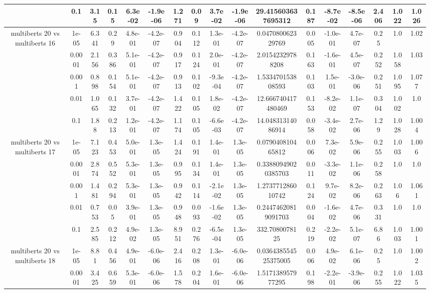\begin{tabular}{|c|c|c|c|c|c|c|c|c|c|c|c|c|c|c|c|c|}
 & 0.1 & 3.15 & 0.15 & 6.3e-02 & -1.9e-06 & 1.271 & 0.09 & 3.7e-02 & -1.9e-06 & 29.415603637695312 & 0.187 & -8.7e-02 & -8.5e-06 & 2.406 & 1.022 & 1.026 \\
\hline
\multirow{5}{*}{multiberts 20 vs multiberts 16} & 1e-05 & 6.341 & 0.29 & 4.8e-01 & -4.2e-07 & 0.904 & 0.112 & 1.3e-01 & -4.2e-07 & 0.047080062329769 & 0.005 & -1.0e-01 & 4.7e-07 & 0.25 & 1.0 & 1.02 \\
 & 0.0001 & 2.156 & 0.386 & 5.1e-01 & -4.2e-07 & 0.917 & 0.124 & 2.0e-01 & -4.2e-07 & 2.01542329788208 & 0.163 & -1.6e-01 & 4.5e-07 & 0.252 & 1.058 & 1.03 \\
 & 0.001 & 0.898 & 0.154 & 5.1e-01 & -4.2e-07 & 0.913 & 0.102 & -9.3e-04 & -4.2e-07 & 1.533470153808593 & 0.103 & 1.5e-01 & -3.0e-06 & 0.251 & 1.095 & 1.077 \\
 & 0.01 & 1.065 & 0.132 & 3.7e-01 & -4.2e-07 & 1.422 & 0.105 & 1.8e-02 & -4.2e-07 & 12.666740417480469 & 0.153 & -8.2e-02 & 1.1e-07 & 0.304 & 1.002 & 1.0 \\
 & 0.1 & 1.88 & 0.213 & 1.2e-01 & -4.2e-07 & 1.174 & 0.105 & -6.6e-03 & -4.2e-07 & 14.04831314086914 & 0.058 & -3.4e-02 & 2.7e-06 & 1.29 & 1.028 & 1.004 \\
\hline
\multirow{5}{*}{multiberts 20 vs multiberts 17} & 1e-05 & 7.123 & 0.453 & 5.0e-01 & 1.3e-05 & 1.424 & 0.191 & 1.4e-01 & 1.3e-05 & 0.079040810465812 & 0.006 & 7.3e-02 & 5.9e-06 & 0.255 & 1.003 & 1.006 \\
 & 0.0001 & 2.874 & 0.552 & 5.3e-01 & 1.3e-05 & 0.995 & 0.134 & 1.4e-01 & 1.3e-05 & 0.33880949020385703 & 0.011 & -3.3e-02 & 1.1e-06 & 0.258 & 1.0 & 1.0 \\
 & 0.001 & 1.481 & 0.294 & 5.3e-01 & 1.3e-05 & 0.942 & 0.114 & -2.1e-02 & 1.3e-05 & 1.273771286010742 & 0.124 & 9.7e-02 & 8.2e-06 & 0.263 & 1.06 & 1.061 \\
 & 0.01 & 0.753 & 0.05 & 3.9e-01 & 1.3e-05 & 0.948 & 0.093 & -1.6e-02 & 1.3e-05 & 0.24474620819091703 & 0.004 & -1.6e-02 & 4.7e-06 & 0.331 & 1.0 & 1.0 \\
 & 0.1 & 2.585 & 0.212 & 4.9e-02 & 1.3e-05 & 8.951 & 0.276 & -6.5e-04 & 1.3e-05 & 332.7080078125 & 0.219 & -2.2e-02 & 5.1e-07 & 6.86 & 1.003 & 1.001 \\
\hline
\multirow{5}{*}{multiberts 20 vs multiberts 18} & 1e-05 & 8.81 & 0.456 & 4.9e-01 & -6.0e-06 & 2.416 & 0.208 & 1.3e-01 & -6.0e-06 & 0.036438554525375005 & 0.006 & 4.9e-02 & 6.1e-06 & 0.25 & 1.0 & 1.002 \\
 & 0.0001 & 3.425 & 0.659 & 5.3e-01 & -6.0e-06 & 1.578 & 0.204 & 1.6e-01 & -6.0e-06 & 1.517138957977295 & 0.198 & -2.2e-01 & -3.9e-06 & 0.255 & 1.022 & 1.035 \\

\end{tabular}
